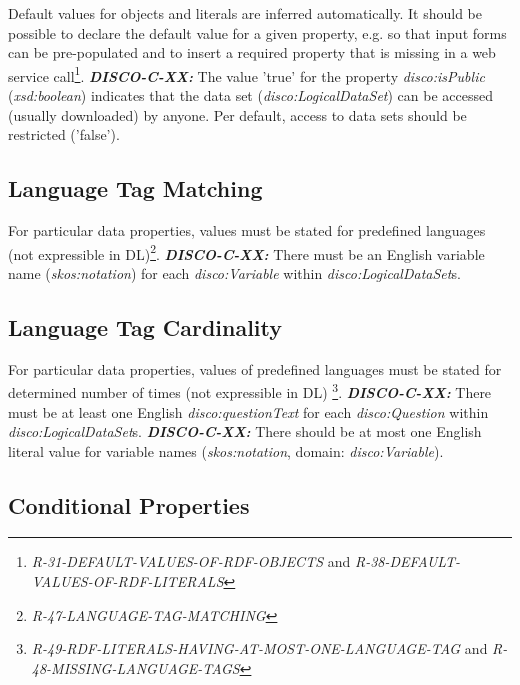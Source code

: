 \documentclass{llncs}
\begin{document}
Default values for objects and literals are inferred automatically.
It should be possible to declare the default value for a given property, e.g. so that input forms can be pre-populated and to insert a required property that is missing in a web service call\footnote{{\em R-31-DEFAULT-VALUES-OF-RDF-OBJECTS} and {\em R-38-DEFAULT-VALUES-OF-RDF-LITERALS}}.
\textbf{{\em DISCO-C-XX:}}
The value 'true' for the property {\em disco:isPublic} ({\em xsd:boolean}) indicates that the data set ({\em disco:LogicalDataSet}) can be accessed (usually downloaded) by anyone.
Per default, access to data sets should be restricted ('false').

\subsection{Language Tag Matching}

For particular data properties, values must be stated for predefined languages (not expressible in DL)\footnote{{\em R-47-LANGUAGE-TAG-MATCHING}}.
\textbf{{\em DISCO-C-XX:}}
There must be an English variable name ({\em skos:notation}) for each {\em disco:Variable} within {\em disco:LogicalDataSet}s.

\subsection{Language Tag Cardinality}

For particular data properties, values of predefined languages must be stated for determined number of times (not expressible in DL)
\footnote{{\em R-49-RDF-LITERALS-HAVING-AT-MOST-ONE-LANGUAGE-TAG} and {\em R-48-MISSING-LANGUAGE-TAGS}}.
\textbf{{\em DISCO-C-XX:}}
There must be at least one English {\em disco:questionText} for each {\em disco:Question} within {\em disco:LogicalDataSet}s.
\textbf{{\em DISCO-C-XX:}}
There should be at most one English literal value for variable names ({\em skos:notation}, domain: {\em disco:Variable}).

\subsection{Conditional Properties}
\end{document}

